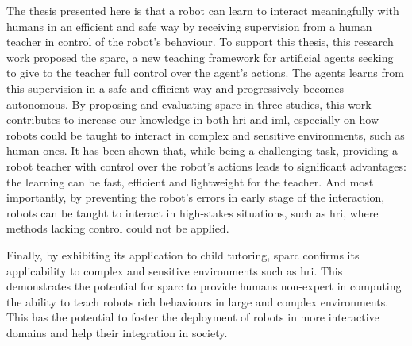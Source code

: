 The thesis presented here is that a robot can learn to interact meaningfully with humans in an efficient and safe way by receiving supervision from a human teacher in control of the robot's behaviour. 
%
%
To support this thesis, this research work proposed the \acrfull{sparc}, a new teaching framework for artificial agents seeking to give to the teacher full control over the agent's actions. The agents learns from this supervision in a safe and efficient way and progressively becomes autonomous. By proposing and evaluating \gls{sparc} in three studies, this work contributes to increase our knowledge in both \gls{hri} and \gls{iml}, especially on how robots could be taught to interact in complex and sensitive environments, such as human ones. It has been shown that, while being a challenging task, providing a robot teacher with control over the robot's actions leads to significant advantages: the learning can be fast, efficient and lightweight for the teacher. And most importantly, by preventing the robot's errors in early stage of the interaction, robots can be taught to interact in high-stakes situations, such as \gls{hri}, where methods lacking control could not be applied.

Finally, by exhibiting its application to child tutoring, \gls{sparc} confirms its applicability to complex and sensitive environments such as \gls{hri}. This demonstrates the potential for \gls{sparc} to provide humans non-expert in computing the ability to teach robots rich behaviours in large and complex environments. This has the potential to foster the deployment of robots in more interactive domains and help their integration in society.